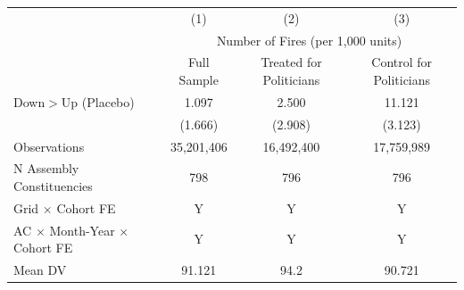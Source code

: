 \begin{tabular}{lccc}
\hline
& (1) & (2) & (3) \\
& \multicolumn{3}{c}{Number of Fires (per 1,000 units)}\\
& Full Sample & Treated for Politicians & Control for Politicians \\
\midrule

Down$>$Up (Placebo)&       1.097         &       2.500         &      11.121\sym{***}\\
            &     (1.666)         &     (2.908)         &     (3.123)         \\
\hline
Observations&  35,201,406         &  16,492,400         &  17,759,989         \\
N Assembly Constituencies&         798         &         796         &         796         \\
Grid $\times$ Cohort FE&           Y         &           Y         &           Y         \\
AC $\times$ Month-Year $\times$ Cohort FE&           Y         &           Y         &           Y         \\
Mean DV     &      91.121         &        94.2         &      90.721         \\
\hline
\end{tabular}
